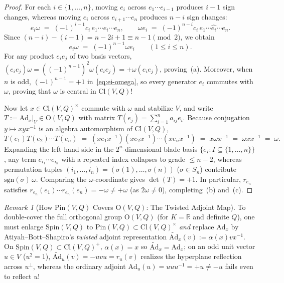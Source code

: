 \documentclass[11pt]{article}
\theoremstyle{definition}
\theoremstyle{remark}
\newtheorem{remark}[theorem]{Remark}
\newcommand{\Cl}{\mathrm{Cl}}
\newcommand{\Spin}{\mathrm{Spin}}
\newcommand{\Pin}{\mathrm{Pin}}
\newcommand{\Ad}{\mathrm{Ad}}
\newcommand{\tAd}{\widetilde{\mathrm{Ad}}}
\newcommand{\Orth}{\mathrm{O}}
\begin{document}
\begin{proof}
For each $i \in \{1, \dots, n\}$, moving $e_i$ across $e_1 \cdots e_{i-1}$ produces $i - 1$ sign changes, whereas moving $e_i$ across $e_{i+1} \cdots e_n$ produces $n - i$ sign changes:
\[
e_i \omega \;=\; (-1)^{i-1} c_i\, e_1 \cdots \widehat{e_i} \cdots e_n, \qquad
\omega e_i \;=\; (-1)^{n-i} c_i\, e_1 \cdots \widehat{e_i} \cdots e_n.
\]
Since $(n - i) - (i - 1) = n - 2i + 1 \equiv n - 1 \pmod{2}$, we obtain
\begin{equation}\label{eq:ei-omega}
e_i \omega \;=\; (-1)^{n-1} \omega e_i \qquad (1 \le i \le n).
\end{equation}
For any product $e_i e_j$ of two basis vectors, $(e_i e_j)\omega = ((-1)^{n-1})^2 \omega (e_i e_j) = +\omega (e_i e_j)$, proving~(a). Moreover, when $n$ is odd, $(-1)^{n-1} = +1$ in~\eqref{eq:ei-omega}, so every generator $e_i$ commutes with $\omega$, proving that $\omega$ is central in $\Cl(V,Q)$!

Now let $x \in \Cl(V,Q)^\times$ commute with $\omega$ and stabilize $V$, and write $T := \Ad_x|_V \in \Orth(V,Q)$ with matrix $T(e_j) = \sum_{i=1}^n a_{ij} e_i$. Because conjugation $y \mapsto x y x^{-1}$ is an algebra automorphism of $\Cl(V,Q)$,
\[
T(e_1) T(e_2) \cdots T(e_n) \;=\; (x e_1 x^{-1})(x e_2 x^{-1}) \cdots (x e_n x^{-1}) \;=\; x \omega x^{-1} \;=\; \omega x x^{-1} \;=\; \omega.
\]
Expanding the left-hand side in the $2^n$-dimensional blade basis $\{e_I : I \subseteq \{1,\dots,n\}\}$, any term $e_{i_1} \cdots e_{i_n}$ with a repeated index collapses to grade $\le n - 2$, whereas permutation tuples $(i_1, \dots, i_n) = (\sigma(1), \dots, \sigma(n))$ ($\sigma \in S_n$) contribute $\mathrm{sgn}(\sigma)\, \omega$. Comparing the $\omega$-coordinate gives $\det(T) = +1$. In particular, $r_{e_n}$ satisfies $r_{e_n}(e_1) \cdots r_{e_n}(e_n) = -\omega \ne +\omega$ (as $2\omega \ne 0$), completing~(b) and~(c).
\end{proof}

\begin{remark}[How $\Pin(V,Q)$ Covers $\Orth(V,Q)$: The Twisted Adjoint Map]
To double-cover the full orthogonal group $\Orth(V,Q)$ (for $K = \mathbb{R}$ and definite $Q$), one must enlarge $\Spin(V,Q)$ to $\Pin(V,Q) \subset \Cl(V,Q)^\times$ \emph{and} replace $\Ad_x$ by Atiyah--Bott--Shapiro's \emph{twisted} adjoint representation $\tAd_x(v) := \alpha(x) v x^{-1}$. On $\Spin(V,Q) \subset \Cl(V,Q)^+$, $\alpha(x) = x$ so $\tAd_x = \Ad_x$; on an odd unit vector $u \in V$ ($u^2 = 1$), $\tAd_u(v) = -u v u = r_u(v)$ realizes the hyperplane reflection across $u^\perp$, whereas the ordinary adjoint $\Ad_u(u) = u u u^{-1} = +u \ne -u$ fails even to reflect $u$!
\end{remark}
\end{document}
